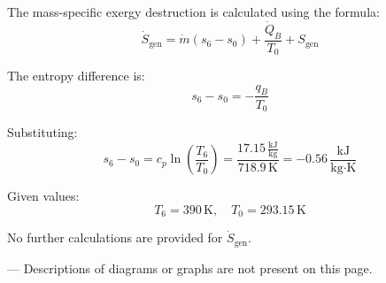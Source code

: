 The mass-specific exergy destruction is calculated using the formula:  
\[
\dot{S}_{\text{gen}} = \dot{m} \left( s_6 - s_0 \right) + \frac{\dot{Q}_B}{T_0} + S_{\text{gen}}
\]  

The entropy difference is:  
\[
s_6 - s_0 = -\frac{q_B}{T_0}
\]  

Substituting:  
\[
s_6 - s_0 = c_p \ln \left( \frac{T_6}{T_0} \right) = \frac{17.15 \, \frac{\text{kJ}}{\text{kg}}}{718.9 \, \text{K}} = -0.56 \, \frac{\text{kJ}}{\text{kg·K}}
\]  

Given values:  
\[
T_6 = 390 \, \text{K}, \quad T_0 = 293.15 \, \text{K}
\]  

No further calculations are provided for \( \dot{S}_{\text{gen}} \).  

---  
Descriptions of diagrams or graphs are not present on this page.